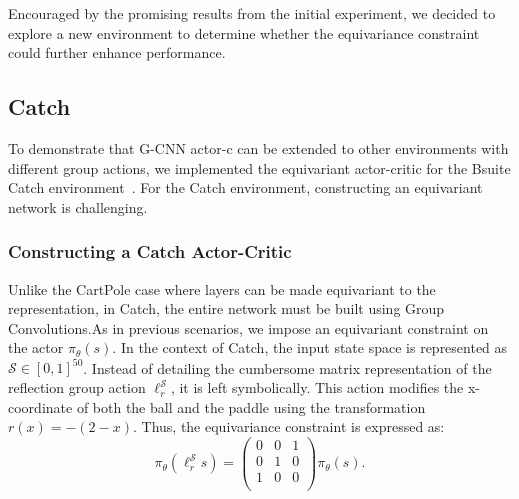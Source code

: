 Encouraged by the promising results from the initial experiment, we decided to explore a new environment to determine whether the equivariance constraint could further enhance performance.

\subsection{Catch}\label{sec:catch_ac}
To demonstrate that G-CNN actor-c can be extended to other environments with different group actions, we implemented the equivariant actor-critic for the Bsuite Catch environment~\cite{osband2020bsuite}. For the Catch environment, constructing an equivariant network is challenging.

\subsubsection{Constructing a Catch Actor-Critic}
Unlike the CartPole case where layers can be made equivariant to the
representation, in Catch, the entire network must be built using Group Convolutions.As in previous scenarios, we impose an equivariant constraint on the actor $\pi_\theta(s)$.
In the context of Catch, the input state space is represented as $\mathcal{S} \in [0, 1]^{50}$. Instead of detailing the cumbersome matrix representation of the reflection group action $\ell_r^\mathcal{S}$, it is left symbolically. This action modifies the x-coordinate of both the ball and the paddle using the transformation $r(x)=-(2-x)$. Thus, the equivariance constraint is expressed as:
\begin{equation}
	\pi_\theta(\ell_r^\mathcal{S} s) = \begin{pmatrix}
		0 & 0 & 1 \\
		0 & 1 & 0 \\
		1 & 0 & 0 \\
	\end{pmatrix}\pi_\theta(s).
\end{equation}
%

